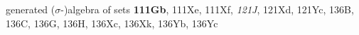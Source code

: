 



































generated ($\sigma$-\nobreak)algebra of sets {\bf 111Gb}, 111Xe, 111Xf,
{\it 121J}, 121Xd, 121Yc, 136B, 136C, 136G, 136H, 136Xc, 136Xk,
136Yb, 136Yc
































































